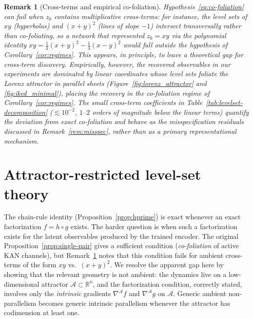\documentclass{article}
\newtheorem{remark}{Remark}
\begin{document}
\begin{remark}[Cross-terms and empirical co-foliation]
\label{rem:cross-term-gap}
Hypothesis~\eqref{eq:co-foliation} can fail when $z_k$ contains
multiplicative cross-terms: for instance, the level sets of $xy$
(hyperbolas) and $(x+y)^2$ (lines of slope $-1$) intersect transversally
rather than co-foliating, so a network that represented $z_k = xy$ via
the polynomial identity
$xy = \tfrac{1}{4}(x+y)^2 - \tfrac{1}{4}(x-y)^2$ would fall outside the
hypothesis of Corollary~\ref{cor:regimes}. This appears, in principle,
to leave a theoretical gap for cross-term discovery. Empirically, however, the recovered observables in our experiments are dominated by
linear coordinates whose level sets foliate the Lorenz attractor in
parallel sheets (Figure~\ref{fig:lorenz_attractor} and \ref{fig:iked_minimal}), placing the
recovery in the co-foliation regime of Corollary~\ref{cor:regimes}.
The small cross-term coefficients in Table~\ref{tab:levelset-decomposition}
($\lesssim 10^{-2}$, $1$--$2$ orders of magnitude below the linear terms)
quantify the deviation from exact co-foliation and behave as the
misspecification residuals discussed in Remark~\ref{rem:misspec}, rather
than as a primary representational mechanism.
\end{remark}

\section{Attractor-restricted level-set theory}
\label{app:attractor}

The chain-rule identity (Proposition~\ref{prop:hprime}) is exact whenever an
exact factorization $f = h\circ g$ exists. The harder question is when such
a factorization exists for the latent observables produced by the trained
encoder. The original Proposition~\ref{prop:single-pair} gives a sufficient
condition (\emph{co-foliation} of active KAN channels), but Remark~\ref{rem:cross-term-gap}
notes that this condition fails for ambient cross-terms of the form
$xy$ vs.\ $(x+y)^2$. We resolve the apparent gap here by showing that the
relevant geometry is not ambient: the dynamics live on a low-dimensional
attractor $\mathcal{A}\subset\mathbb{R}^n$, and the factorization condition,
correctly stated, involves only the \emph{intrinsic} gradients $\nabla^{\!\mathcal{A}} f$
and $\nabla^{\!\mathcal{A}} g$ on $\mathcal{A}$. Generic ambient
non-parallelism becomes generic intrinsic parallelism whenever the attractor
has codimension at least one.
\end{document}
